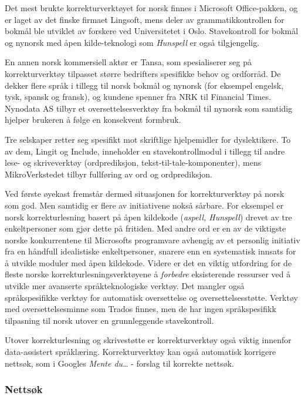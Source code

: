 \begin{multicols}{2}
Det mest brukte korrekturverktøyet for norsk finnes i Microsoft Office-pakken, og er laget av det finske firmaet Lingsoft, mens deler av grammatikkontrollen for bokmål ble utviklet av forskere ved Universitetet i Oslo. Stavekontroll for bokmål og nynorsk med åpen kilde-teknologi som \textit{Hunspell} er også tilgjengelig. 

En annen norsk kommersiell aktør er Tansa, som spesialiserer seg på korrekturverktøy tilpasset større bedrifters spesifikke behov og ordforråd. 
De dekker flere språk i tillegg til norsk bokmål og nynorsk (for eksempel engelsk, tysk, spansk og fransk), og kundene spenner fra NRK til Financial Times. 
Nynodata AS tilbyr et oversettelsesverktøy fra bokmål til nynorsk som samtidig hjelper brukeren å følge en konsekvent formbruk.

Tre selskaper retter seg spesifikt mot skriftlige hjelpemidler for dyslektikere. To av dem, Lingit og Include, inneholder en stavekontrollmodul i tillegg til andre lese- og skriveverktøy (ordprediksjon, tekst-til-tale-komponenter), mens MikroVerkstedet tilbyr fullføring av ord og ordprediksjon.

Ved første øyekast fremstår dermed situasjonen for korrekturverktøy på norsk som god. 
Men samtidig er flere av initiativene nokså sårbare. 
For eksempel er norsk korrekturlesning basert på åpen kildekode (\textit{aspell, Hunspell}) drevet av tre enkeltpersoner som gjør dette på fritiden. 
Med andre ord er en av de viktigste norske konkurrentene til Microsofts programvare avhengig av et personlig initiativ fra en håndfull idealistiske enkeltpersoner, snarere enn en systematisk innsats for å utvikle moduler med åpen kildekode. 
Videre er det en viktig utfordring for de fleste norske korrekturlesningsverktøyene å \textit{forbedre} eksisterende ressurser ved å utvikle mer avanserte språkteknologiske verktøy.  Det mangler også språkspesifikke verktøy for automatisk oversettelse og oversettelsesstøtte. Verktøy med oversettelsesminne som Trados finnes, men de har ingen språkspesifikk tilpasning til norsk utover en grunnleggende stavekontroll.

Utover korrekturlesning og skrivestøtte er korrekturverktøy også viktig innenfor data-assistert språklæring. Korrekturverktøy kan også automatisk korrigere nettsøk, som i Googles \textit{Mente du…}  - forslag til korrekte nettsøk.

\subsubsection{Nettsøk}


\end{multicols}
